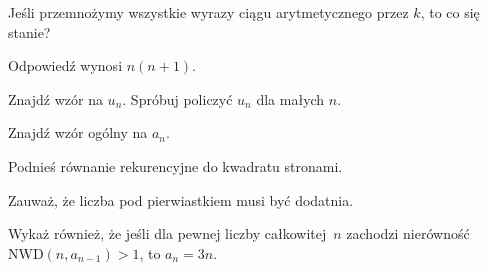 
\begin{hints_list}
	\item Jeśli przemnożymy wszystkie wyrazy ciągu arytmetycznego przez $k$, to co się stanie?
	\item Odpowiedź wynosi $n(n + 1)$.
	\item Znajdź wzór na $u_n$. Spróbuj policzyć $u_n$ dla małych $n$.
	\item Znajdź wzór ogólny na $a_n$.
	\item Podnieś równanie rekurencyjne do kwadratu stronami.
	\item Zauważ, że liczba pod pierwiastkiem musi być dodatnia.
	\item Wykaż również, że jeśli dla pewnej liczby całkowitej~$n$ zachodzi nierówność $\mathrm{NWD}(n, a_{n - 1}) > 1$, to $a_n = 3n$.
\end{hints_list}